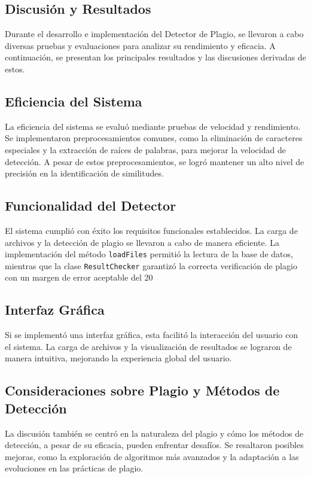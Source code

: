 \documentclass[a4paper]{article}
\begin{document}
\begin{multicols}{2}
\section{Discusión y Resultados}
Durante el desarrollo e implementación del Detector de Plagio, se llevaron a cabo diversas pruebas y evaluaciones para analizar su rendimiento y eficacia. A continuación, se presentan los principales resultados y las discusiones derivadas de estos.

\subsection{Eficiencia del Sistema}

La eficiencia del sistema se evaluó mediante pruebas de velocidad y rendimiento. Se implementaron preprocesamientos comunes, como la eliminación de caracteres especiales y la extracción de raíces de palabras, para mejorar la velocidad de detección. A pesar de estos preprocesamientos, se logró mantener un alto nivel de precisión en la identificación de similitudes.

\subsection{Funcionalidad del Detector}

El sistema cumplió con éxito los requisitos funcionales establecidos. La carga de archivos y la detección de plagio se llevaron a cabo de manera eficiente. La implementación del método \texttt{loadFiles} permitió la lectura de la base de datos, mientras que la clase \texttt{ResultChecker} garantizó la correcta verificación de plagio con un margen de error aceptable del 20%

\subsection{Interfaz Gráfica}

Si se implementó una interfaz gráfica, esta facilitó la interacción del usuario con el sistema. La carga de archivos y la visualización de resultados se lograron de manera intuitiva, mejorando la experiencia global del usuario.

\subsection{Consideraciones sobre Plagio y Métodos de Detección}

La discusión también se centró en la naturaleza del plagio y cómo los métodos de detección, a pesar de su eficacia, pueden enfrentar desafíos. Se resaltaron posibles mejoras, como la exploración de algoritmos más avanzados y la adaptación a las evoluciones en las prácticas de plagio.


\end{multicols}
\end{document}
